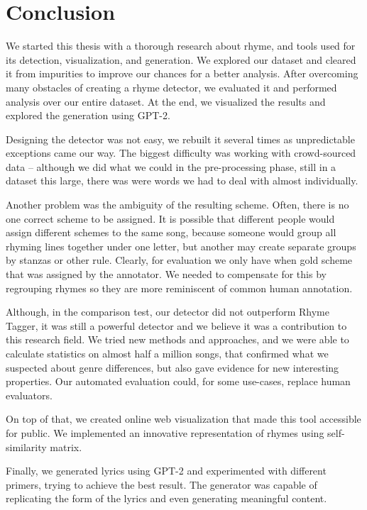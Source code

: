 \chapter*{Conclusion}\label{conclusion}
We started this thesis with a thorough research about rhyme, and tools used for its detection, visualization, and generation. We explored our dataset and cleared it from impurities to improve our chances for a better analysis. After overcoming many obstacles of creating a rhyme detector, we evaluated it and performed analysis over our entire dataset. At the end, we visualized the results and explored the generation using GPT-2.

Designing the detector was not easy, we rebuilt it several times as unpredictable exceptions came our way. The biggest difficulty was working with crowd-sourced data -- although we did what we could in the pre-processing phase, still in a dataset this large, there was were words we had to deal with almost individually.

Another problem was the ambiguity of the resulting scheme. Often, there is no one correct scheme to be assigned. It is possible that different people would assign different schemes to the same song, because someone would group all rhyming lines together under one letter, but another may create separate groups by stanzas or other rule. Clearly, for evaluation we only have when gold scheme that was assigned by the annotator. We needed to compensate for this by regrouping rhymes so they are more reminiscent of common human annotation.

Although, in the comparison test, our detector did not outperform Rhyme Tagger, it was still a powerful detector and we believe it was a contribution to this research field. We tried new methods and approaches, and we were able to calculate statistics on almost half a million songs, that confirmed what we suspected about genre differences, but also gave evidence for new interesting properties. Our automated evaluation could, for some use-cases, replace human evaluators.

On top of that, we created online web visualization that made this tool accessible for public. We implemented an innovative representation of rhymes using self-similarity matrix.

Finally, we generated lyrics using GPT-2 and experimented with different primers, trying to achieve the best result. The generator was capable of replicating the form of the lyrics and even generating meaningful content. 

